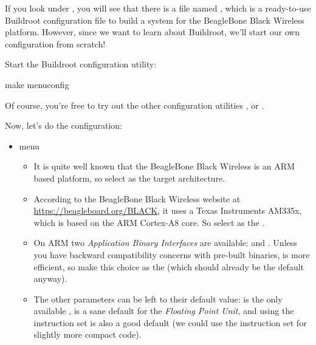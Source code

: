 If you look under , you will see that there is a file
named , which is a ready-to-use Buildroot
configuration file to build a system for the BeagleBone Black Wireless
platform. However, since we want to learn about Buildroot, we'll start
our own configuration from scratch!

Start the Buildroot configuration utility:

\begin{bashinput}
make menuconfig
\end{bashinput}

Of course, you're free to try out the other configuration utilities
,  or .

Now, let's do the configuration:

\begin{itemize}

\item {} menu

  \begin{itemize}

  \item It is quite well known that the BeagleBone Black Wireless is
    an ARM based platform, so select  as the
    target architecture.

  \item According to the BeagleBone Black Wireless website at
    \url{https://beagleboard.org/BLACK}, it uses a Texas Instruments
    AM335x, which is based on the ARM Cortex-A8 core. So select
     as the .

  \item On ARM two {\em Application Binary Interfaces} are available:
     and . Unless you have backward
    compatibility concerns with pre-built binaries,  is
    more efficient, so make this choice as the 
    (which should already be the default anyway).

  \item The other parameters can be left to their default value:
     is the only available ,
     is a sane default for the {\em Floating Point
      Unit}, and using the  instruction set is also a good
    default (we could use the  instruction set for
    slightly more compact code).

  \end{itemize}


\end{itemize}
